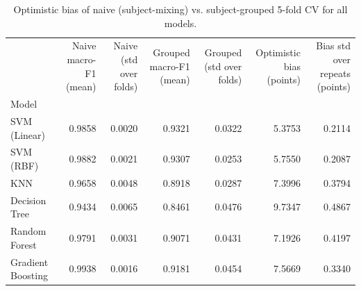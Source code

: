 \begin{table}
\caption{Optimistic bias of naive (subject-mixing) vs. subject-grouped 5-fold CV for all models.}
\label{tab:Ext14_leakage_bias_all_models}
\begin{tabular}{lrrrrrr}
\toprule
 & Naive macro-F1 (mean) & Naive (std over folds) & Grouped macro-F1 (mean) & Grouped (std over folds) & Optimistic bias (points) & Bias std over repeats (points) \\
Model &  &  &  &  &  &  \\
\midrule
SVM (Linear) & 0.9858 & 0.0020 & 0.9321 & 0.0322 & 5.3753 & 0.2114 \\
SVM (RBF) & 0.9882 & 0.0021 & 0.9307 & 0.0253 & 5.7550 & 0.2087 \\
KNN & 0.9658 & 0.0048 & 0.8918 & 0.0287 & 7.3996 & 0.3794 \\
Decision Tree & 0.9434 & 0.0065 & 0.8461 & 0.0476 & 9.7347 & 0.4867 \\
Random Forest & 0.9791 & 0.0031 & 0.9071 & 0.0431 & 7.1926 & 0.4197 \\
Gradient Boosting & 0.9938 & 0.0016 & 0.9181 & 0.0454 & 7.5669 & 0.3340 \\
\bottomrule
\end{tabular}
\end{table}
